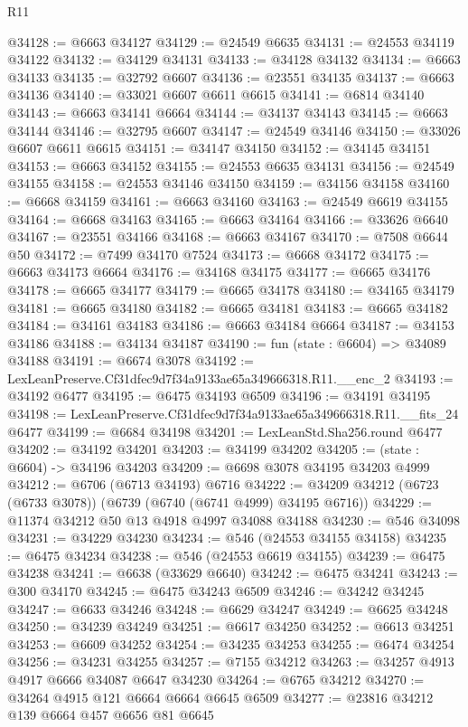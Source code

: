 \begin{lexlean}{R11}
\begin{coremodule}
@34128 := @6663 @34127
@34129 := @24549 @6635
@34131 := @24553 @34119 @34122
@34132 := @34129 @34131
@34133 := @34128 @34132
@34134 := @6663 @34133
@34135 := @32792 @6607
@34136 := @23551 @34135
@34137 := @6663 @34136
@34140 := @33021 @6607 @6611 @6615
@34141 := @6814 @34140
@34143 := @6663 @34141 @6664
@34144 := @34137 @34143
@34145 := @6663 @34144
@34146 := @32795 @6607
@34147 := @24549 @34146
@34150 := @33026 @6607 @6611 @6615
@34151 := @34147 @34150
@34152 := @34145 @34151
@34153 := @6663 @34152
@34155 := @24553 @6635 @34131
@34156 := @24549 @34155
@34158 := @24553 @34146 @34150
@34159 := @34156 @34158
@34160 := @6668 @34159
@34161 := @6663 @34160
@34163 := @24549 @6619 @34155
@34164 := @6668 @34163
@34165 := @6663 @34164
@34166 := @33626 @6640
@34167 := @23551 @34166
@34168 := @6663 @34167
@34170 := @7508 @6644 @50
@34172 := @7499 @34170 @7524
@34173 := @6668 @34172
@34175 := @6663 @34173 @6664
@34176 := @34168 @34175
@34177 := @6665 @34176
@34178 := @6665 @34177
@34179 := @6665 @34178
@34180 := @34165 @34179
@34181 := @6665 @34180
@34182 := @6665 @34181
@34183 := @6665 @34182
@34184 := @34161 @34183
@34186 := @6663 @34184 @6664
@34187 := @34153 @34186
@34188 := @34134 @34187
@34190 := fun (state : @6604) => @34089 @34188
@34191 := @6674 @3078
@34192 := LexLeanPreserve.Cf31dfec9d7f34a9133ae65a349666318.R11.__enc_2
@34193 := @34192 @6477
@34195 := @6475 @34193 @6509
@34196 := @34191 @34195
@34198 := LexLeanPreserve.Cf31dfec9d7f34a9133ae65a349666318.R11.__fits_24 @6477
@34199 := @6684 @34198
@34201 := LexLeanStd.Sha256.round @6477
@34202 := @34192 @34201
@34203 := @34199 @34202
@34205 := (state : @6604) -> @34196 @34203
@34209 := @6698 @3078 @34195 @34203 @4999
@34212 := @6706 (@6713 @34193) @6716
@34222 := @34209 @34212 (@6723 (@6733 @3078)) (@6739 (@6740 (@6741 @4999) @34195 @6716))
@34229 := @11374 @34212 @50 @13 @4918 @4997 @34088 @34188
@34230 := @546 @34098
@34231 := @34229 @34230
@34234 := @546 (@24553 @34155 @34158)
@34235 := @6475 @34234
@34238 := @546 (@24553 @6619 @34155)
@34239 := @6475 @34238
@34241 := @6638 (@33629 @6640)
@34242 := @6475 @34241
@34243 := @300 @34170
@34245 := @6475 @34243 @6509
@34246 := @34242 @34245
@34247 := @6633 @34246
@34248 := @6629 @34247
@34249 := @6625 @34248
@34250 := @34239 @34249
@34251 := @6617 @34250
@34252 := @6613 @34251
@34253 := @6609 @34252
@34254 := @34235 @34253
@34255 := @6474 @34254
@34256 := @34231 @34255
@34257 := @7155 @34212
@34263 := @34257 @4913 @4917 @6666 @34087 @6647 @34230
@34264 := @6765 @34212
@34270 := @34264 @4915 @121 @6664 @6664 @6645 @6509
@34277 := @23816 @34212 @139 @6664 @457 @6656 @81 @6645

\end{coremodule}
\end{lexlean}
